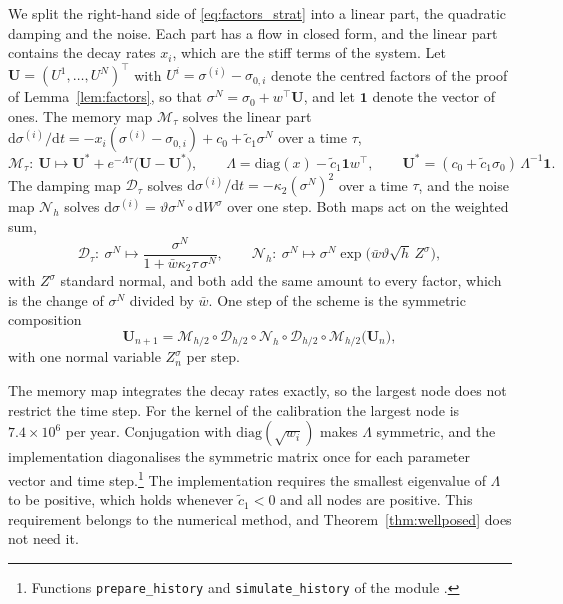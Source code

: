\documentclass[11pt,a4paper]{article}
\theoremstyle{definition}
\newcommand{\D}{\mathrm{d}}
\newcommand{\one}{\mathbf{1}}
\begin{document}
We split the right-hand side of \eqref{eq:factors_strat} into a linear part, the quadratic damping and the noise. Each part has a flow in closed form, and the linear part contains the decay rates $x_i$, which are the stiff terms of the system. Let $\boldsymbol U=(U^1,\dots,U^N)^\top$ with $U^i=\sigma^{(i)}-\sigma_{0,i}$ denote the centred factors of the proof of Lemma~\ref{lem:factors}, so that $\sigma^N=\sigma_0+w^\top\boldsymbol U$, and let $\one$ denote the vector of ones. The memory map $\mathcal{M}_\tau$ solves the linear part $\D\sigma^{(i)}/\D t=-x_i(\sigma^{(i)}-\sigma_{0,i})+c_0+\tilde c_1\sigma^N$ over a time $\tau$,
\begin{equation}\label{eq:memory_map}
\mathcal{M}_\tau:\ \boldsymbol U\mapsto\boldsymbol U^\ast+e^{-\Lambda\tau}\big(\boldsymbol U-\boldsymbol U^\ast\big),\qquad \Lambda=\mathrm{diag}(x)-\tilde c_1\one w^\top,\qquad \boldsymbol U^\ast=(c_0+\tilde c_1\sigma_0)\,\Lambda^{-1}\one .
\end{equation}
The damping map $\mathcal{D}_\tau$ solves $\D\sigma^{(i)}/\D t=-\kappa_2(\sigma^N)^2$ over a time $\tau$, and the noise map $\mathcal{N}_h$ solves $\D\sigma^{(i)}=\vartheta\sigma^N\circ\D W^\sigma$ over one step. Both maps act on the weighted sum,
\begin{equation}\label{eq:scalar_maps}
\mathcal{D}_\tau:\ \sigma^N\mapsto\frac{\sigma^N}{1+\bar w\kappa_2\tau\,\sigma^N},\qquad
\mathcal{N}_h:\ \sigma^N\mapsto\sigma^N\exp\big(\bar w\vartheta\sqrt h\,Z^\sigma\big),
\end{equation}
with $Z^\sigma$ standard normal, and both add the same amount to every factor, which is the change of $\sigma^N$ divided by $\bar w$. One step of the scheme is the symmetric composition
\begin{equation}\label{eq:scheme}
\boldsymbol U_{n+1}=\mathcal{M}_{h/2}\circ\mathcal{D}_{h/2}\circ\mathcal{N}_h\circ\mathcal{D}_{h/2}\circ\mathcal{M}_{h/2}\big(\boldsymbol U_n\big),
\end{equation}
with one normal variable $Z^\sigma_n$ per step.

The memory map integrates the decay rates exactly, so the largest node does not restrict the time step. For the kernel of the calibration the largest node is $7.4\times10^6$ per year. Conjugation with $\mathrm{diag}(\sqrt{w_i})$ makes $\Lambda$ symmetric, and the implementation diagonalises the symmetric matrix once for each parameter vector and time step.\footnote{Functions \texttt{prepare\_history} and \texttt{simulate\_history} of the module .} The implementation requires the smallest eigenvalue of $\Lambda$ to be positive, which holds whenever $\tilde c_1<0$ and all nodes are positive. This requirement belongs to the numerical method, and Theorem~\ref{thm:wellposed} does not need it.
\end{document}
